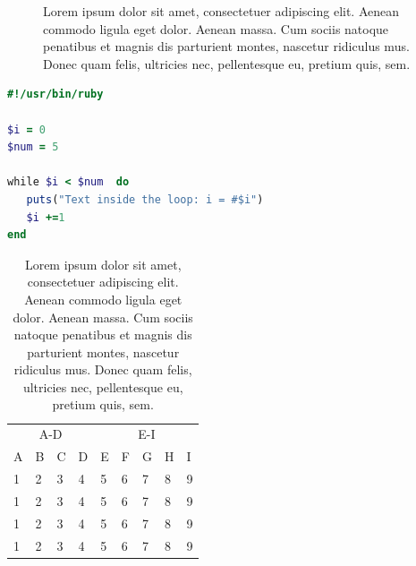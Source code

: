 \begin{figure}
   \caption{Lorem ipsum dolor sit amet, consectetuer adipiscing elit. Aenean
   commodo ligula eget dolor. Aenean massa. Cum sociis natoque penatibus et magnis
   dis parturient montes, nascetur ridiculus mus. Donec quam felis, ultricies nec,
   pellentesque eu, pretium quis, sem.}
\label{fig:test_plot_two}
\end{figure} %

\lipsum[1-4]

\begin{lstlisting}[language=Ruby]
#!/usr/bin/ruby

$i = 0
$num = 5

while $i < $num  do
   puts("Text inside the loop: i = #$i")
   $i +=1
end
\end{lstlisting}


\begin{table} %
	\centering
	\label{tab:test_table_two}
	\caption{Lorem ipsum dolor sit amet, consectetuer adipiscing elit. Aenean
	 commodo ligula eget dolor. Aenean massa. Cum sociis natoque penatibus et magnis
	 dis parturient montes, nascetur ridiculus mus. Donec quam felis, ultricies nec,
	 pellentesque eu, pretium quis, sem.}
	   {\small
		\begin{tabular}{p{}p{}p{}p{}p{}p{}p{}p{}p{}}
				\toprule
				   \multicolumn{4}{c}{A-D}   & \multicolumn{5}{c}{E-I}\\
				\cmidrule(lr){1-4} \cmidrule(lr){5-9}
					A     & B & C & D & E & F & G & H & I\\
				\midrule
					1     & 2 & 3 & 4 & 5 & 6 & 7 & 8 & 9\\
					1     & 2 & 3 & 4 & 5 & 6 & 7 & 8 & 9\\
					1     & 2 & 3 & 4 & 5 & 6 & 7 & 8 & 9\\
					1     & 2 & 3 & 4 & 5 & 6 & 7 & 8 & 9\\
				\bottomrule
			\end{tabular}
		}
\end{table} %



